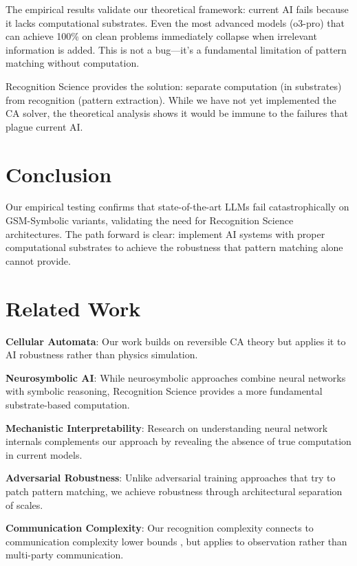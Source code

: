 \documentclass[11pt,letterpaper]{article}
\theoremstyle{plain}
\theoremstyle{definition}
\theoremstyle{remark}
\begin{document}
The empirical results validate our theoretical framework: current AI fails because it lacks computational substrates. Even the most advanced models (o3-pro) that can achieve 100\% on clean problems immediately collapse when irrelevant information is added. This is not a bug—it's a fundamental limitation of pattern matching without computation.

Recognition Science provides the solution: separate computation (in substrates) from recognition (pattern extraction). While we have not yet implemented the CA solver, the theoretical analysis shows it would be immune to the failures that plague current AI.

\section{Conclusion}

Our empirical testing confirms that state-of-the-art LLMs fail catastrophically on GSM-Symbolic variants, validating the need for Recognition Science architectures. The path forward is clear: implement AI systems with proper computational substrates to achieve the robustness that pattern matching alone cannot provide.

\section{Related Work}

\textbf{Cellular Automata}: Our work builds on reversible CA theory \cite{margolus1984physics,fredkin1982conservative} but applies it to AI robustness rather than physics simulation.

\textbf{Neurosymbolic AI}: While neurosymbolic approaches \cite{garcez2019neural} combine neural networks with symbolic reasoning, Recognition Science provides a more fundamental substrate-based computation.

\textbf{Mechanistic Interpretability}: Research on understanding neural network internals \cite{olah2020zoom} complements our approach by revealing the absence of true computation in current models.

\textbf{Adversarial Robustness}: Unlike adversarial training approaches \cite{madry2018towards} that try to patch pattern matching, we achieve robustness through architectural separation of scales.

\textbf{Communication Complexity}: Our recognition complexity connects to communication complexity lower bounds \cite{kushilevitz1997communication}, but applies to observation rather than multi-party communication.
\end{document}
